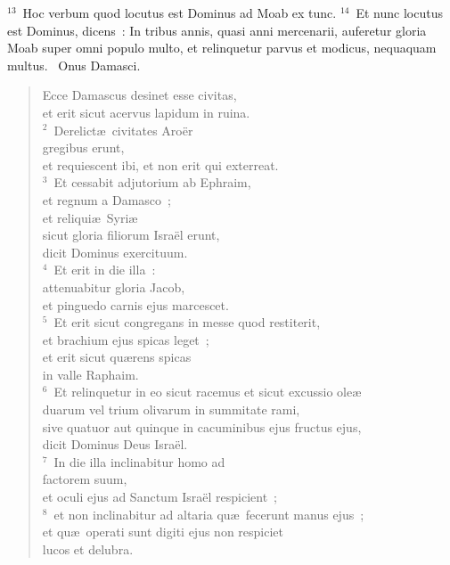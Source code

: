 ${}^{13}$~Hoc verbum quod locutus est Dominus ad Moab ex tunc.
${}^{14}$~Et nunc locutus est Dominus, dicens~: In tribus annis, quasi anni mercenarii, auferetur gloria Moab super omni populo multo, et relinquetur parvus et modicus, nequaquam multus.
~Onus Damasci. \begin{flushleft}\begin{verse}\vspace{6pt}Ecce Damascus desinet esse civitas,\\ et erit sicut acervus lapidum in ruina.\\
${}^{2}$~Derelict\ae\ civitates Aro\"er\\ gregibus erunt,\\ et requiescent ibi, et non erit qui exterreat.\\
${}^{3}$~Et cessabit adjutorium ab Ephraim,\\ et regnum a Damasco~;\\ et reliqui\ae\ Syri\ae \\ sicut gloria filiorum Isra\"el erunt,\\ dicit Dominus exercituum.\\
${}^{4}$~Et erit in die illa~:\\ attenuabitur gloria Jacob,\\ et pinguedo carnis ejus marcescet.\\
${}^{5}$~Et erit sicut congregans in messe quod restiterit,\\ et brachium ejus spicas leget~;\\ et erit sicut qu\ae rens spicas\\ in valle Raphaim.\\
${}^{6}$~Et relinquetur in eo sicut racemus et sicut excussio ole\ae \\ duarum vel trium olivarum in summitate rami,\\ sive quatuor aut quinque in cacuminibus ejus fructus ejus,\\ dicit Dominus Deus Isra\"el.\\
${}^{7}$~In die illa inclinabitur homo ad\\ factorem suum,\\ et oculi ejus ad Sanctum Isra\"el respicient~;\\
${}^{8}$~et non inclinabitur ad altaria qu\ae\ fecerunt manus ejus~;\\ et qu\ae\ operati sunt digiti ejus non respiciet\\ lucos et delubra.\\

\end{verse}
\end{flushleft}
